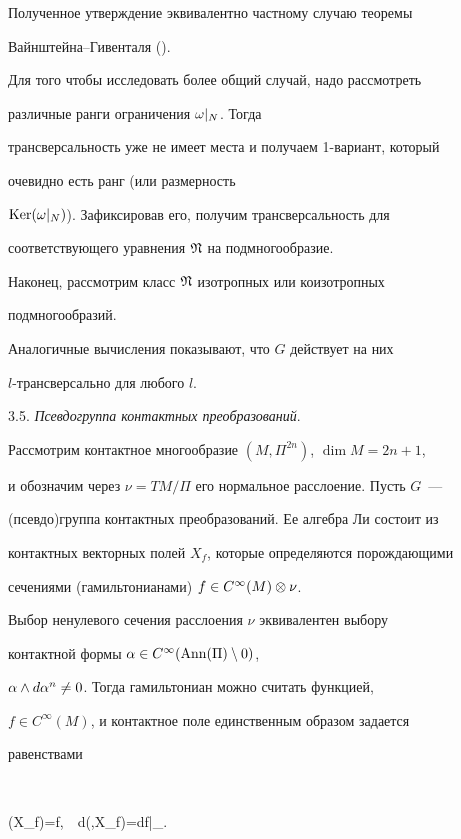 Полученное утверждение эквивалентно частному случаю теоремы


Вайнштейна--Гивенталя (\cite{AG}).


Для того чтобы исследовать более общий случай, надо рассмотреть


различные ранги ограничения $\omega|_N$. Тогда


трансверсальность уже не имеет места и получаем 1-вариант, который


очевидно есть ранг (или размерность


$\operatorname{Ker}(\omega|_N)$). Зафиксировав его, получим трансверсальность для 


соответствующего уравнения $\frak{N}$ на подмногообразие.





Наконец, рассмотрим класс $\frak{N}$ изотропных или коизотропных


подмногообразий.


Аналогичные вычисления показывают, что $G$ действует на них


$l$-трансверсально для любого $l$.


\medskip





3.5. {\it Псевдогруппа контактных преобразований}.


Рассмотрим контактное многообразие $(M,\Pi^{2n})$, $\dim M=2n+1$,


и обозначим через $\nu=TM/\Pi$ его нормальное расслоение. Пусть $G$~---


(псевдо)группа контактных преобразований. Ее алгебра Ли состоит из


контактных векторных полей $X_f$, которые определяются порождающими


сечениями (гамильтонианами) $f\in C^\infty(M)\otimes\nu$.





Выбор ненулевого сечения расслоения $\nu$ эквивалентен выбору


контактной формы $\alpha\in C^\infty(\operatorname{Ann}(\Pi)\setminus 0)$,


$\alpha\wedge d\alpha^n\ne0$. Тогда гамильтониан можно считать функцией,


$f\in C^\infty(M)$, и контактное поле единственным образом задается


равенствами


$$


\a(X_f)=f,\ \ d\a(\cdot,X_f)=df|_{\Pi}.


